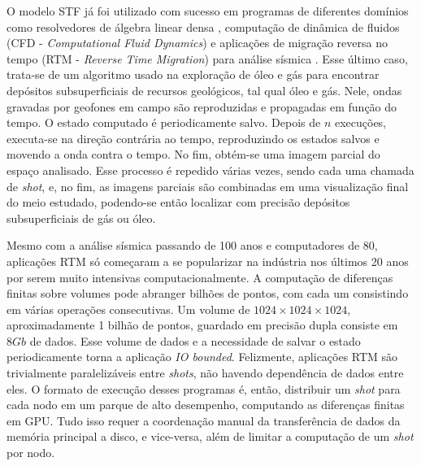 \documentclass[ppgc,pep]{infufrgs}
\begin{document}
O modelo STF já foi utilizado com sucesso em programas de diferentes domínios como resolvedores de álgebra linear densa \cite{abdulah_accelerating_2022}, computação de dinâmica de fluidos (CFD - \textit{Computational Fluid Dynamics}) \cite{couteyen_carpaye_design_2018,leandro_nesi_task-based_2020} e aplicações de migração reversa no tempo (RTM - \textit{Reverse Time Migration}) para análise sísmica \cite{boillot_task-based_2014,alonazi_asynchronous_2019}. Esse último caso, trata-se de um algoritmo usado na exploração de óleo e gás para encontrar depósitos subsuperficiais de recursos geológicos, tal qual óleo e gás. Nele, ondas gravadas por geofones em campo são reproduzidas e propagadas em função do tempo. O estado computado é periodicamente salvo. Depois de $n$ execuções, executa-se na direção contrária ao tempo, reproduzindo os estados salvos e movendo a onda contra o tempo. No fim, obtém-se uma imagem parcial do espaço analisado. Esse processo é repedido várias vezes, sendo cada uma chamada de \textit{shot}, e, no fim, as imagens parciais são combinadas em uma visualização final do meio estudado, podendo-se então localizar com precisão depósitos subsuperficiais de gás ou óleo.

Mesmo com a análise sísmica passando de 100 anos e computadores de 80, aplicações RTM só começaram a se popularizar na indústria nos últimos 20 anos por serem muito intensivas computacionalmente. A computação de diferenças finitas sobre volumes pode abranger bilhões de pontos, com cada um consistindo em várias operações consecutivas. Um volume de $1024 \times 1024 \times 1024$, aproximadamente 1 bilhão de pontos, guardado em precisão dupla consiste em $8Gb$ de dados. Esse volume de dados e a necessidade de salvar o estado periodicamente torna a aplicação \textit{IO bounded}. Felizmente, aplicações RTM são trivialmente paralelizáveis entre \textit{shots}, não havendo dependência de dados entre eles. O formato de execução desses programas é, então, distribuir um \textit{shot} para cada nodo em um parque de alto desempenho, computando as diferenças finitas em GPU. Tudo isso requer a coordenação manual da transferência de dados da memória principal a disco, e vice-versa, além de limitar a computação de um \textit{shot} por nodo.
\end{document}
